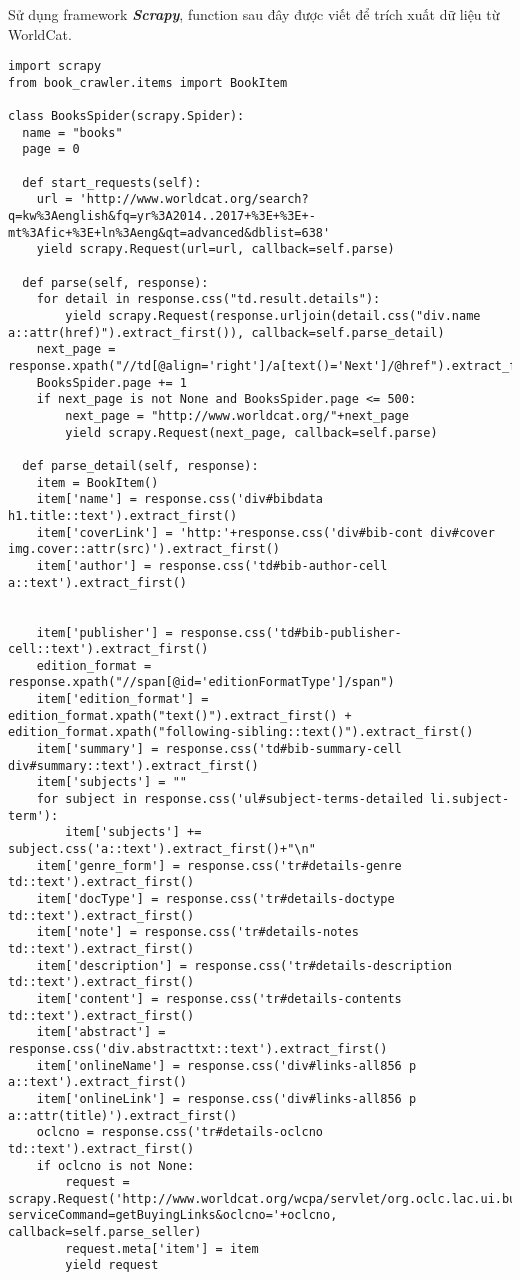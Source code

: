 Sử dụng framework \textbf{\textit{Scrapy}}, function sau đây được viết để trích xuất dữ liệu từ WorldCat.\\

\begin{lstlisting}[frame = single, style=pythoncode, breaklines=true]
import scrapy
from book_crawler.items import BookItem

class BooksSpider(scrapy.Spider):
  name = "books"
  page = 0

  def start_requests(self):
	url = 'http://www.worldcat.org/search?q=kw%3Aenglish&fq=yr%3A2014..2017+%3E+%3E+-mt%3Afic+%3E+ln%3Aeng&qt=advanced&dblist=638'
	yield scrapy.Request(url=url, callback=self.parse)

  def parse(self, response):
	for detail in response.css("td.result.details"):
		yield scrapy.Request(response.urljoin(detail.css("div.name a::attr(href)").extract_first()), callback=self.parse_detail)
	next_page = response.xpath("//td[@align='right']/a[text()='Next']/@href").extract_first()
	BooksSpider.page += 1
	if next_page is not None and BooksSpider.page <= 500:
		next_page = "http://www.worldcat.org/"+next_page
		yield scrapy.Request(next_page, callback=self.parse)

  def parse_detail(self, response):
	item = BookItem()
	item['name'] = response.css('div#bibdata h1.title::text').extract_first()
	item['coverLink'] = 'http:'+response.css('div#bib-cont div#cover img.cover::attr(src)').extract_first()
	item['author'] = response.css('td#bib-author-cell a::text').extract_first()
	
	
	item['publisher'] = response.css('td#bib-publisher-cell::text').extract_first()	 
	edition_format = response.xpath("//span[@id='editionFormatType']/span")
	item['edition_format'] = edition_format.xpath("text()").extract_first() + edition_format.xpath("following-sibling::text()").extract_first()
	item['summary'] = response.css('td#bib-summary-cell div#summary::text').extract_first()
	item['subjects'] = ""
	for subject in response.css('ul#subject-terms-detailed li.subject-term'):
		item['subjects'] += subject.css('a::text').extract_first()+"\n"
	item['genre_form'] = response.css('tr#details-genre td::text').extract_first()
	item['docType'] = response.css('tr#details-doctype td::text').extract_first()
	item['note'] = response.css('tr#details-notes td::text').extract_first()
	item['description'] = response.css('tr#details-description td::text').extract_first()
	item['content'] = response.css('tr#details-contents td::text').extract_first()
	item['abstract'] = response.css('div.abstracttxt::text').extract_first()
	item['onlineName'] = response.css('div#links-all856 p a::text').extract_first()
	item['onlineLink'] = response.css('div#links-all856 p a::attr(title)').extract_first()
	oclcno = response.css('tr#details-oclcno td::text').extract_first()
	if oclcno is not None:
		request = scrapy.Request('http://www.worldcat.org/wcpa/servlet/org.oclc.lac.ui.buying.AjaxBuyingLinksServlet?serviceCommand=getBuyingLinks&oclcno='+oclcno, callback=self.parse_seller)
		request.meta['item'] = item
		yield request


\end{lstlisting}
